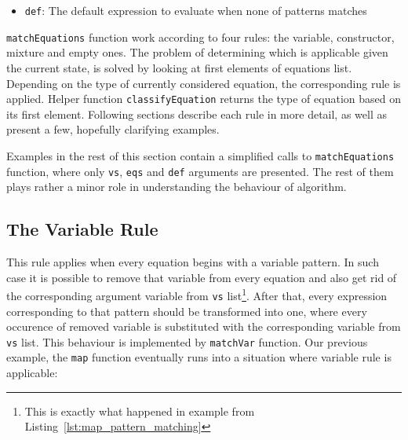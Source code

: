 \documentclass[12pt,a4paper]{report}
\begin{document}
\begin{itemize}
\vspace*{0.2in}
\begin{code}[style=haskell]
  ECaseConstr ((EConstr 3 2 (ENum 1)) (EConstr 2 0))
              [(PConstr 2 0 [], ENum 0),
               (PConstr 3 2 [PVar x, PVar xs], EVar x)]
\end{code}

\texttt{Pattern} type instances on the other hand represents patterns itself.
Patterns might be numbers, variables, constructors or special entities standing
for patterns chosen when none of other branches match. Below, the definition of
\texttt{Pattern} type is presented:

\vspace*{0.2in}
\begin{code}[style=haskell]
  data Pattern = PNum Int
               | PVar Name
               | PChar Int
               | PConstrName Name [Pattern]
               | PConstr Int Int [Pattern]
               | PDefault
\end{code}


  \item \texttt{def}: The default expression to evaluate when none of patterns
    matches
\end{itemize}

\texttt{matchEquations} function work according to four rules: the variable,
constructor, mixture and empty ones. The problem of determining which is
applicable given the current state, is solved by looking at first elements of
equations list. Depending on the type of currently considered equation, the
corresponding rule is applied. Helper function \texttt{classifyEquation}
returns the type of equation based on its first element. Following sections
describe each rule in more detail, as well as present a few, hopefully
clarifying examples.

Examples in the rest of this section contain a simplified calls to
\texttt{matchEquations} function, where only \texttt{vs}, \texttt{eqs} and
\texttt{def} arguments are presented. The rest of them plays rather a minor
role in understanding the behaviour of algorithm.


\subsection{The Variable Rule}
This rule applies when every equation begins with a variable pattern. In such
case it is possible to remove that variable from every equation and also get
rid of the corresponding argument variable from \texttt{vs} list\footnote{This
is exactly what happened in example from
Listing~\ref{lst:map_pattern_matching}}. After that, every expression
corresponding to that pattern should be transformed into one, where every
occurence of removed variable is substituted with the corresponding variable
from \texttt{vs} list. This behaviour is implemented by \texttt{matchVar}
function.  Our previous example, the \texttt{map} function eventually runs into
a situation where variable rule is applicable:
\end{document}
